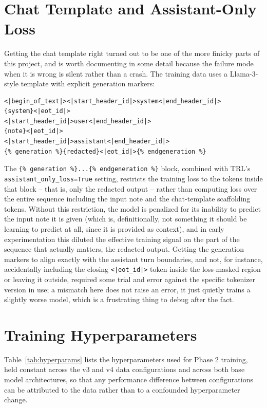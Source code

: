 \documentclass[12pt,a4paper]{report}
\begin{document}
\section{Chat Template and Assistant-Only Loss}
\label{sec:chat-template}

Getting the chat template right turned out to be one of the more finicky parts of this project, and is worth documenting in some detail because the failure mode when it is wrong is silent rather than a crash. The training data uses a Llama-3-style template with explicit generation markers:

\begin{lstlisting}[language={},basicstyle=\ttfamily\scriptsize]
<|begin_of_text|><|start_header_id|>system<|end_header_id|>
{system}<|eot_id|>
<|start_header_id|>user<|end_header_id|>
{note}<|eot_id|>
<|start_header_id|>assistant<|end_header_id|>
{% generation %}{redacted}<|eot_id|>{% endgeneration %}
\end{lstlisting}

The \texttt{\{\% generation \%\}...\{\% endgeneration \%\}} block, combined with TRL's \texttt{assistant\_only\_loss=True} setting, restricts the training loss to the tokens inside that block -- that is, only the redacted output -- rather than computing loss over the entire sequence including the input note and the chat-template scaffolding tokens. Without this restriction, the model is penalized for its inability to predict the input note it is given (which is, definitionally, not something it should be learning to predict at all, since it is provided as context), and in early experimentation this diluted the effective training signal on the part of the sequence that actually matters, the redacted output. Getting the generation markers to align exactly with the assistant turn boundaries, and not, for instance, accidentally including the closing \texttt{<|eot\_id|>} token inside the loss-masked region or leaving it outside, required some trial and error against the specific tokenizer version in use; a mismatch here does not raise an error, it just quietly trains a slightly worse model, which is a frustrating thing to debug after the fact.

\section{Training Hyperparameters}

Table~\ref{tab:hyperparams} lists the hyperparameters used for Phase 2 training, held constant across the v3 and v4 data configurations and across both base model architectures, so that any performance difference between configurations can be attributed to the data rather than to a confounded hyperparameter change.
\end{document}
